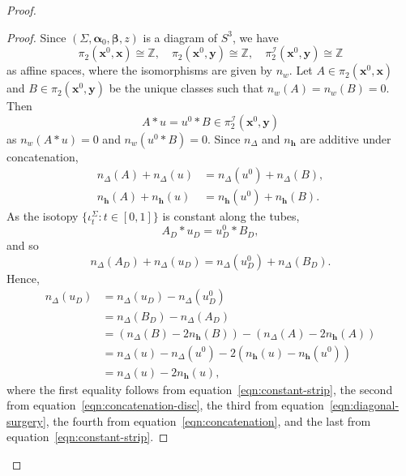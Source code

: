 \documentclass[11pt]{amsart}
\numberwithin{equation}{section}
\numberwithin{figure}{section}
\theoremstyle{definition}
\newcommand{\bZ}{\mathbb{Z}}
\newcommand{\sI}{\mathscr{I}}
\newcommand{\as}{\boldsymbol{\alpha}}
\newcommand{\bs}{\boldsymbol{\beta}}
\newcommand{\hs}{\boldsymbol{h}}
\newcommand{\xs}{\boldsymbol{x}}
\newcommand{\ys}{\boldsymbol{y}}
\begin{document}
\begin{proof}
    \begin{proof}
        Since $(\Sigma, \as_0, \bs, z)$ is a diagram of $S^3$, we have 
        \[
        \pi_2(\xs^0, \xs) \cong \bZ, \quad \pi_2(\xs^0, \ys) \cong \bZ, \quad \pi_2^{\sI}(\xs^0, \ys) \cong \bZ 
        \]
        as affine spaces, where the isomorphisms are given by $n_w$. Let $A \in \pi_2(\xs^0, \xs)$ and $B \in \pi_2(\xs^0, \ys)$ be the unique classes such that $n_w(A) = n_w(B) = 0$. Then 
        \[
        A \ast u = u^0 \ast B \in \pi_2^{\sI}(\xs^0, \ys)
        \]
        as $n_w(A \ast u) = 0$ and $n_w(u^0 \ast B) = 0$. Since $n_\Delta$ and $n_{\hs}$ are additive under concatenation,
        \begin{equation}\label{eqn:concatenation}
        \begin{split}
        n_\Delta(A) + n_\Delta(u) &= n_\Delta(u^0) + n_\Delta(B), \\
        n_{\hs}(A) + n_{\hs}(u) &= n_{\hs}(u^0) + n_{\hs}(B).
        \end{split}
        \end{equation}
        As the isotopy $\{\iota_t^\Sigma : t \in [0,1]\}$ is constant along the tubes,
        \[
        A_D \ast u_D = u^0_D \ast B_D,
        \]
        and so
        \begin{equation}\label{eqn:concatenation-disc}
        n_\Delta(A_D) + n_\Delta(u_D) = n_\Delta(u^0_D) + n_\Delta(B_D).
        \end{equation}
        Hence,
        \[
        \begin{split}
        n_\Delta(u_D) &= n_\Delta(u_D) - n_\Delta(u_D^0) \\
        &= n_\Delta(B_D) - n_\Delta(A_D) \\
        &= (n_\Delta(B) - 2n_{\hs}(B)) - (n_\Delta(A) - 2n_{\hs}(A)) \\
        &= n_\Delta(u) - n_\Delta(u^0) - 2(n_{\hs}(u) - n_{\hs}(u^0)) \\
        &= n_\Delta(u) - 2n_{\hs}(u),
        \end{split}
        \]
        where the first equality follows from equation~\eqref{eqn:constant-strip}, the second from equation~\eqref{eqn:concatenation-disc}, the third from equation~\eqref{eqn:diagonal-surgery}, the fourth from equation~\eqref{eqn:concatenation}, and the last from equation~\eqref{eqn:constant-strip}.
    \end{proof}
    

\end{proof}
\end{document}
